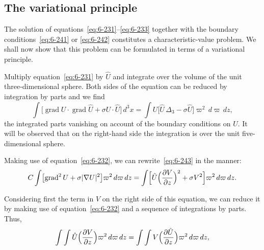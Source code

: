 \subsection{The variational principle}\label{sec:61d}
The solution of equations~\eqref{eq:6-231}--\eqref{eq:6-233} together with the boundary
conditions~\eqref{eq:6-241} or \eqref{eq:6-242} constitutes a characteristic-value problem. We
shall now show that this problem can be formulated in terms of a varia\-tional principle.

Multiply equation~\eqref{eq:6-231} by $\hat{U}$ and integrate over the volume of the
unit three-dimensional sphere. Both sides of the equation can be
reduced by integration by parts and we find
\begin{equation}\label{eq:6-243}
\int\bigl[\operatorname{grad} U\cdot\operatorname{grad}\hat{U}+\sigma U\cdot\hat{U}\bigr]\,d^3x = \int U\bigl[\hat{U}\,\Delta_3 - \sigma\hat{U}\bigr]\varpi^2\,d\varpi\,dz,
\end{equation}
the integrated parts vanishing on account of the boundary conditions on
$U$. It will be observed that on the right-hand side the integration is over
the unit five-dimensional sphere.

Making use of equation~\eqref{eq:6-232}, we can rewrite~\eqref{eq:6-243} in the
manner:
\begin{equation}\label{eq:6-244}
C\int\bigl[\operatorname{grad}^2 U + \sigma|\nabla U|^2\bigr]\varpi^2\,d\varpi\,dz = \int\Bigl[\hat{U}\Bigl(\frac{\partial V}{\partial z}\Bigr)^2 + \sigma V^2\Bigr]\varpi^2\,d\varpi\,dz.
\end{equation}

Considering first the term in $V$ on the right side of this equation,
we can reduce it by making use of equation~\eqref{eq:6-232} and a sequence of
integrations by parts. Thus,
\begin{equation}\label{eq:6-245}
\int\int \hat{U}\Bigl(\frac{\partial V}{\partial z}\Bigr) \varpi^2\,d\varpi\,dz = \int\int V\Bigl(\frac{\partial\hat{U}}{\partial z}\Bigr)\varpi^2\,d\varpi\,dz,
\end{equation}

